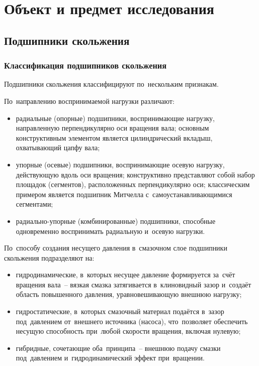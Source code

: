 \chapter{Объект и предмет исследования}

\section{Подшипники скольжения}

\subsection{Классификация подшипников скольжения}

Подшипники скольжения классифицируют по~нескольким признакам.

По~направлению воспринимаемой нагрузки различают:
\begin{itemize}
\item радиальные (опорные) подшипники, воспринимающие нагрузку, направленную перпендикулярно оси вращения вала; основным конструктивным элементом является цилиндрический вкладыш, охватывающий цапфу вала;
\item упорные (осевые) подшипники, воспринимающие осевую нагрузку, действующую вдоль оси вращения; конструктивно представляют собой набор площадок (сегментов), расположенных перпендикулярно оси; классическим примером является подшипник Митчелла с~самоустанавливающимися сегментами;
\item радиально-упорные (комбинированные) подшипники, способные одновременно воспринимать радиальную и~осевую нагрузки.
\end{itemize}

По~способу создания несущего давления в~смазочном слое подшипники скольжения подразделяют на:
\begin{itemize}
\item гидродинамические, в~которых несущее давление формируется за~счёт вращения вала~-- вязкая смазка затягивается в~клиновидный зазор и~создаёт область повышенного давления, уравновешивающую внешнюю нагрузку;
\item гидростатические, в~которых смазочный материал подаётся в~зазор под~давлением от~внешнего источника (насоса), что~позволяет обеспечить несущую способность при~любой скорости вращения, включая нулевую;
\item гибридные, сочетающие оба~принципа~-- внешнюю подачу смазки под~давлением и~гидродинамический эффект при~вращении.
\end{itemize}

